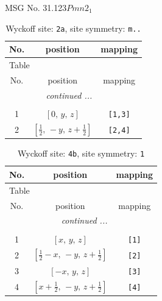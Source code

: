 \documentclass[fleqn,8pt]{jsarticle}
\begin{document}
\setcounter{MaxMatrixCols}{32}

\renewcommand{\tablename}{Table~}
\renewcommand{\figurename}{Figure~}
\begin{center}
\LARGE
MSG No. 31.123\quad$Pmn2_{1}$
\end{center}
\renewcommand{\arraystretch}{1.2}
\begin{longtable}{ccc}
\caption{Wyckoff site: {\tt 2a}, site symmetry: {\tt m..}}
 \\
 \hline \hline
No. & position & mapping \\ \hline \endfirsthead

\multicolumn{2}{l}{\tablename\ \thetable{}} \\
 \hline \hline
No. & position & mapping \\ \hline \endhead

 \hline \hline
\multicolumn{2}{r}{\footnotesize\it continued ...} \\ \endfoot

 \hline \hline
\multicolumn{2}{r}{} \\ \endlastfoot

1 & $\left[ 0,\, y,\, z \right]$ & {\tt [1,3]} \\ \hline
2 & $\left[ \frac{1}{2},\, - y,\, z + \frac{1}{2} \right]$ & {\tt [2,4]} \\
\end{longtable}
\renewcommand{\arraystretch}{1.2}
\begin{longtable}{ccc}
\caption{Wyckoff site: {\tt 4b}, site symmetry: {\tt 1}}
 \\
 \hline \hline
No. & position & mapping \\ \hline \endfirsthead

\multicolumn{2}{l}{\tablename\ \thetable{}} \\
 \hline \hline
No. & position & mapping \\ \hline \endhead

 \hline \hline
\multicolumn{2}{r}{\footnotesize\it continued ...} \\ \endfoot

 \hline \hline
\multicolumn{2}{r}{} \\ \endlastfoot

1 & $\left[ x,\, y,\, z \right]$ & {\tt [1]} \\ \hline
2 & $\left[ \frac{1}{2} - x,\, - y,\, z + \frac{1}{2} \right]$ & {\tt [2]} \\ \hline
3 & $\left[ - x,\, y,\, z \right]$ & {\tt [3]} \\ \hline
4 & $\left[ x + \frac{1}{2},\, - y,\, z + \frac{1}{2} \right]$ & {\tt [4]} \\
\end{longtable}
\end{document}
